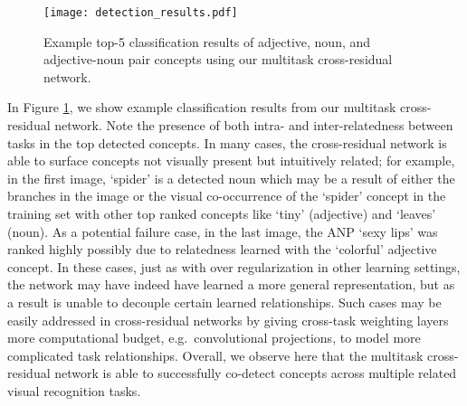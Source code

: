 \documentclass{sig-alternate-05-2015}
\begin{document}
\begin{figure}[t]
  \centering
  \texttt{[image: detection\_results.pdf]} %
  \caption{Example top-5 classification results of adjective, noun, and adjective-noun pair concepts using our multitask cross-residual network.}
  \label{fig:detection_results}
\end{figure}

In Figure \ref{fig:detection_results}, we show example classification results from our multitask cross-residual network.
Note the presence of both intra- and inter-relatedness between tasks in the top detected concepts.
In many cases, the cross-residual network is able to surface concepts not visually present but intuitively related; for example, in the first image, `spider' is a detected noun which may be a result of either the branches in the image or the visual co-occurrence of the `spider' concept in the training set with other top ranked concepts like `tiny' (adjective) and `leaves' (noun).
As a potential failure case, in the last image, the ANP `sexy lips' was ranked highly possibly due to relatedness learned with the `colorful' adjective concept.
In these cases, just as with over regularization in other learning settings, the network may have indeed have learned a more general representation, but as a result is unable to decouple certain learned relationships.
Such cases may be easily addressed in cross-residual networks by giving cross-task weighting layers more computational budget, e.g.~convolutional projections, to model more complicated task relationships.
Overall, we observe here that the multitask cross-residual network is able to successfully co-detect concepts across multiple related visual recognition tasks.
\end{document}
